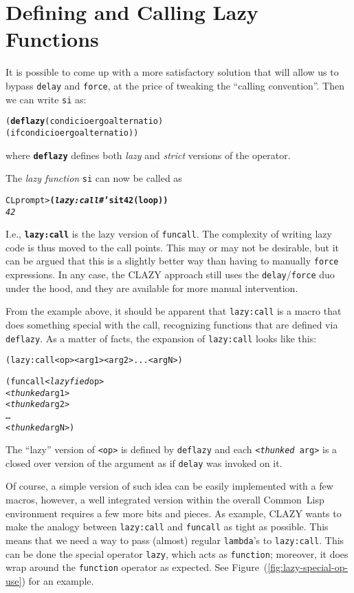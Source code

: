 \documentclass[fleqn,10pt]{article}
\newcommand{\CL}{\textsf{Common~Lisp}}
\newcommand{\CLAZY}{\textsf{CLAZY}}
\newcommand{\code}[1]{\texttt{#1}}
\begin{document}
\section{Defining and Calling Lazy Functions}

It is possible to come up with a more satisfactory solution that will
allow us to bypass \code{delay} and \code{force}, at the price of
tweaking the ``calling convention''.  Then we can write \code{si}
as:
\begin{alltt}

    (\textbf{deflazy} (condicio ergo alternatio)
       (if condicio ergo alternatio))

\end{alltt}
where \textbf{\code{deflazy}} defines both \emph{lazy} and
\emph{strict} versions of the operator.

\noindent
The \emph{lazy function} \code{si} can now be called as
\begin{alltt}

    CL prompt> \textbf{(\textit{lazy:call} #'si t 42 (loop))}
    \textit{42}

\end{alltt}
I.e., \textbf{\code{lazy:call}} is the lazy version of \code{funcall}.
The complexity of writing lazy code is thus moved to the call points.
This may or may not be desirable, but it can be argued that this is a
slightly better way than having to manually \code{force} expressions.
In any case, the \CLAZY{} approach still uses the
\code{delay}/\code{force} duo under the hood, and they are available
for more manual intervention.

From the example above, it should be apparent that \code{lazy:call} is
a macro that does something special with the call, recognizing
functions that are defined via \code{deflazy}.  As a matter of facts,
the expansion of \code{lazy:call} looks like this:
\begin{alltt}

   (lazy:call <op> <arg1> <arg2> ... <argN>)
   
   (funcall <\textit{lazyfied} op>
            <\textit{thunked} arg1>
            <\textit{thunked} arg2>
            \ldots
            <\textit{thunked} argN>)

\end{alltt}
The ``lazy'' version of \code{<op>} is defined by
\code{deflazy} and each \code{<\textit{thunked}~arg>} is a closed
over version of the argument as if \code{delay} was invoked on it.

Of course, a simple version of such idea can be easily implemented
with a few macros, however, a well integrated version within the
overall \CL{} environment requires a few more bits and pieces.  As
example, \CLAZY{} wants to make the analogy between \code{lazy:call}
and \code{funcall} as tight as possible.  This means that we need a
way to pass (almost) regular \code{lambda}'s to \code{lazy:call}.
This can be done the special operator \code{lazy}, which acts as
\code{function}; moreover, it does wrap around the \code{function}
operator as expected.  See Figure~(\ref{fig:lazy-special-op-use}) for an
example.
\end{document}
